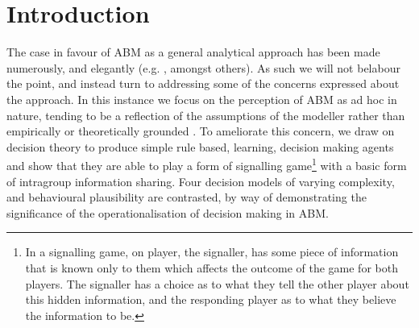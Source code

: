 \section{Introduction}
\label{sec:intro}

The case in favour of \ac{ABM} as a general analytical approach has been made numerously, and elegantly (e.g. \citet{epstein1994growing,Resnick,Axelrod1997,gilbert1999simulation,Macy2002a,Silverman2011,Silverman2013,epstein2014agent_zero}, amongst others). As such we will not belabour the point, and instead turn to addressing some of the concerns expressed about the approach. In this instance we focus on the perception of \ac{ABM} as ad hoc in nature, tending to be a reflection of the assumptions of the modeller rather than empirically or theoretically grounded \citep{Waldherr2013}. To ameliorate this concern, we draw on decision theory to produce simple rule based, learning, decision making agents and show that they are able to play a form of signalling game\footnote{In a signalling game, on player, the signaller, has some piece of information that is known only to them which affects the outcome of the game for both players. The signaller has a choice as to what they tell the other player about this hidden information, and the responding player as to what they believe the information to be.} \citep{Kreps1987} with a basic form of intragroup information sharing. Four decision models of varying complexity, and behavioural plausibility are contrasted, by way of demonstrating the significance of the operationalisation of decision making in \ac{ABM}.

